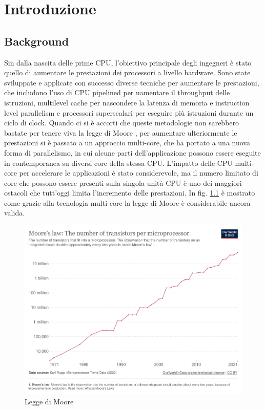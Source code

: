 \chapter{Introduzione}
\label{sec:intro}


\section[Background]{Background}

Sin dalla nascita delle prime \gls{CPU}, l'obiettivo principale degli ingegneri è stato quello di aumentare le prestazioni dei processori a livello hardware. Sono state sviluppate e applicate con successo diverse tecniche per aumentare le prestazioni, che includono l'uso di CPU pipelined per uamentare il throughput delle istruzioni, multilevel cache per nascondere la latenza di memoria e instruction level parallelism e processori superscalari per eseguire più istruzioni durante un ciclo di clock.
Quando ci si è accorti che queste metodologie non sarebbero bastate per tenere viva la legge di Moore \cite[]{Moore:law}, per aumentare ulteriormente le prestazioni si è passato a un approccio multi-core, che ha portato a una nuova forma di parallelismo, in cui alcune parti dell'applicazione possono essere eseguite in contemporanea su diversi core della stessa CPU. L'impatto delle CPU multi-core per accelerare le applicazioni è stato considerevole, ma il numero limitato di core che possono essere presenti sulla singola unità CPU è uno dei maggiori ostacoli che tutt'oggi limita l'incremento delle prestazioni. In fig. \ref{fig:moore_law} è mostrato come grazie alla tecnologia multi-core la legge di Moore è considerabile ancora valida.

\begin{figure}[ht]
\centering
\includegraphics[width=.9\linewidth]{images/chapter1/moore_law2.png}
\caption{Legge di Moore}
\label{fig:moore_law}
\end{figure}

